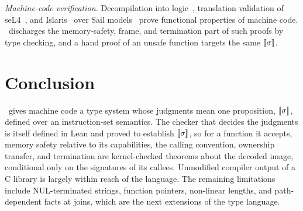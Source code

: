 \emph{Machine-code verification.} Decompilation into logic~\cite{myreen}, translation validation of seL4~\cite{sel4tv}, and Islaris~\cite{islaris} over Sail models~\cite{sail} prove functional properties of machine code. \sys\ discharges the memory-safety, frame, and termination part of such proofs by type checking, and a hand proof of an unsafe function targets the same $[\![\sigma]\!]$.

\section{Conclusion}
\sys\ gives machine code a type system whose judgments mean one proposition, $[\![\sigma]\!]$, defined over an instruction-set semantics. The checker that decides the judgments is itself defined in Lean and proved to establish $[\![\sigma]\!]$, so for a function it accepts, memory safety relative to its capabilities, the calling convention, ownership transfer, and termination are kernel-checked theorems about the decoded image, conditional only on the signatures of its callees. Unmodified compiler output of a C library is largely within reach of the language. The remaining limitations include NUL-terminated strings, function pointers, non-linear lengths, and path-dependent facts at joins, which are the next extensions of the type language.




\appendix
